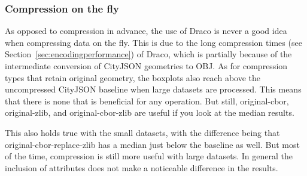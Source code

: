

\subsubsection{Compression on the fly}

As opposed to compression in advance, the use of Draco is never a good idea when compressing data on the fly.
This is due to the long compression times (see Section~\ref{sec:encodingperformance}) of Draco, which is partially because of the intermediate conversion of CityJSON geometries to OBJ.
As for compression types that retain original geometry, the boxplots also reach above the uncompressed CityJSON baseline when large datasets are processed.
This means that there is none that is beneficial for any operation.
But still, original-cbor, original-zlib, and original-cbor-zlib are useful if you look at the median results.

This also holds true with the small datasets, with the difference being that original-cbor-replace-zlib has a median just below the baseline as well.
But most of the time, compression is still more useful with large datasets.
In general the inclusion of attributes does not make a noticeable difference in the results.

